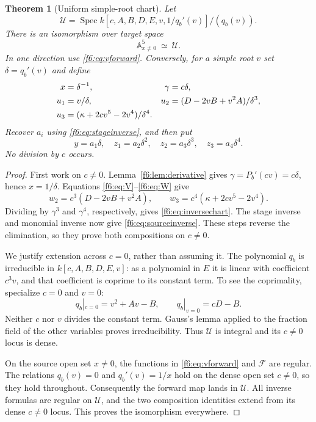 \documentclass[11pt,a4paper]{article}
\newtheorem{theorem}{Theorem}[section]
\theoremstyle{definition}
\newcommand{\A}{\mathbb A}
\newcommand{\Spec}{\operatorname{Spec}}
\newcommand{\F}{\mathcal F}
\newcommand{\kk}{\kappa}
\begin{document}
\begin{theorem}[Uniform simple-root chart]\label{f6:thm:chart}
Let
\[
 \mathcal U=\Spec k[c,A,B,D,E,v,1/q_b'(v)]/(q_b(v)).
\]
There is an isomorphism over target space
\[
 \A^5_{x\ne0}\ \simeq\ \mathcal U.
\]
In one direction use \eqref{f6:eq:vforward}. Conversely, for a simple root
$v$ set $\delta=q_b'(v)$ and define
\begin{align}
 x&=\delta^{-1},& \gamma&=c\delta,\notag\\
 u_1&=v/\delta,&
 u_2&=(D-2vB+v^2A)/\delta^3,\label{f6:eq:inversechart}\\
 u_3&=(\kk+2cv^5-2v^4)/\delta^4.&&\notag
\end{align}
Recover $a_i$ using \eqref{f6:eq:stageinverse}, and then put
\begin{equation}\label{f6:eq:sourceinverse}
 y=a_1\delta,\quad z_1=a_2\delta^2,\quad
 z_2=a_3\delta^3,\quad z_3=a_4\delta^4.
\end{equation}
No division by $c$ occurs.
\end{theorem}
\begin{proof}
First work on $c\ne0$. Lemma~\ref{f6:lem:derivative} gives
$\gamma=P_b'(cv)=c\delta$, hence $x=1/\delta$.
Equations \eqref{f6:eq:V}--\eqref{f6:eq:W} give
\[
 w_2=c^3(D-2vB+v^2A),\qquad
 w_3=c^4(\kk+2cv^5-2v^4).
\]
Dividing by $\gamma^3$ and $\gamma^4$, respectively, gives
\eqref{f6:eq:inversechart}. The stage inverse and monomial inverse now give
\eqref{f6:eq:sourceinverse}. These steps reverse the elimination, so they
prove both compositions on $c\ne0$.

We justify extension across $c=0$, rather than assuming it. The polynomial
$q_b$ is irreducible in $k[c,A,B,D,E,v]$: as a polynomial in $E$ it is
linear with coefficient $c^3v$, and that coefficient is coprime to its
constant term. To see the coprimality, specialize $c=0$ and $v=0$:
\[
 q_b|_{c=0}=v^2+Av-B,\qquad q_b|_{v=0}=cD-B.
\]
Neither $c$ nor $v$ divides the constant term. Gauss's lemma applied to
the fraction field of the other variables proves irreducibility. Thus
$\mathcal U$ is integral and its $c\ne0$ locus is dense.

On the source open set $x\ne0$, the functions in \eqref{f6:eq:vforward}
and $\F$ are regular. The relations $q_b(v)=0$ and
$q_b'(v)=1/x$ hold on the dense open set $c\ne0$, so they hold throughout.
Consequently the forward map lands in $\mathcal U$. All inverse formulas
are regular on $\mathcal U$, and the two composition identities extend
from its dense $c\ne0$ locus. This proves the isomorphism everywhere.
\end{proof}
\end{document}
